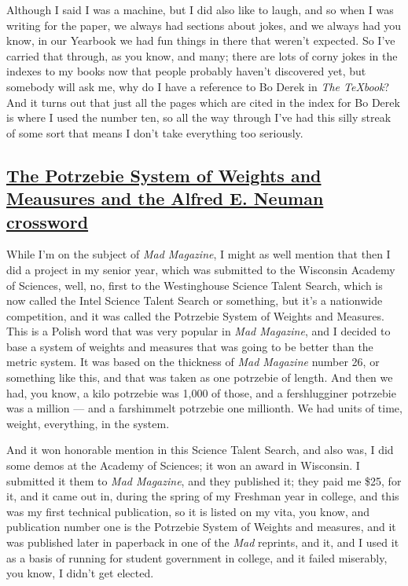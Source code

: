 \documentclass[]{article}
\begin{document}
Although I said I was a machine, but I did also like to laugh, and so
when I was writing for the paper, we always had sections about jokes,
and we always had you know, in our Yearbook we had fun things in there
that weren't expected. So I've carried that through, as you know, and
many; there are lots of corny jokes in the indexes to my books now that
people probably haven't discovered yet, but somebody will ask me, why do
I have a reference to Bo Derek in \emph{The TeXbook}? And it turns out
that just all the pages which are cited in the index for Bo Derek is
where I used the number ten, so all the way through I've had this silly
streak of some sort that means I don't take everything too seriously.

\subsection{\texorpdfstring{\href{http://webofstories.com/play/17067}{The
Potrzebie System of Weights and Meausures and the Alfred E. Neuman
crossword}}{The Potrzebie System of Weights and Meausures and the Alfred E. Neuman crossword}}\label{the-potrzebie-system-of-weights-and-meausures-and-the-alfred-e.-neuman-crossword}

While I'm on the subject of \emph{Mad Magazine}, I might as well mention
that then I did a project in my senior year, which was submitted to the
Wisconsin Academy of Sciences, well, no, first to the Westinghouse
Science Talent Search, which is now called the Intel Science Talent
Search or something, but it's a nationwide competition, and it was
called the Potrzebie System of Weights and Measures. This is a Polish
word that was very popular in \emph{Mad Magazine}, and I decided to base
a system of weights and measures that was going to be better than the
metric system. It was based on the thickness of \emph{Mad Magazine}
number 26, or something like this, and that was taken as one potrzebie
of length. And then we had, you know, a kilo potrzebie was 1,000 of
those, and a fershlugginer potrzebie was a million --- and a farshimmelt
potrzebie one millionth. We had units of time, weight, everything, in
the system.

And it won honorable mention in this Science Talent Search, and also
was, I did some demos at the Academy of Sciences; it won an award in
Wisconsin. I submitted it them to \emph{Mad Magazine}, and they
published it; they paid me \$25, for it, and it came out in, during the
spring of my Freshman year in college, and this was my first technical
publication, so it is listed on my vita, you know, and publication
number one is the Potrzebie System of Weights and measures, and it was
published later in paperback in one of the \emph{Mad} reprints, and it,
and I used it as a basis of running for student government in college,
and it failed miserably, you know, I didn't get elected.
\end{document}
